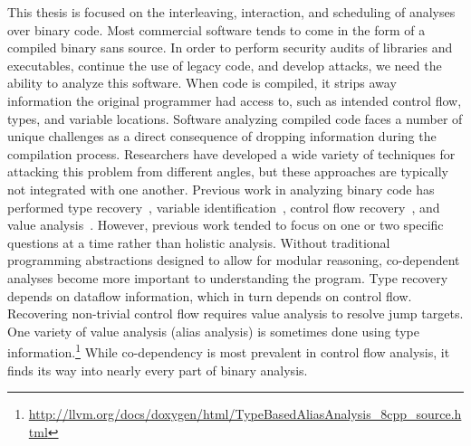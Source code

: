 {\fontsize{10}{12}\selectfont
This thesis is focused on the interleaving, interaction, and scheduling of analyses over binary code.
Most commercial software tends to come in the form of a compiled binary sans source.
In order to perform security audits of libraries and executables, continue the use of legacy code, and develop attacks, we need the ability to analyze this software.
When code is compiled, it strips away information the original programmer had access to, such as intended control flow, types, and variable locations.
Software analyzing compiled code faces a number of unique challenges as a direct consequence of dropping information during the compilation process.
Researchers have developed a wide variety of techniques for attacking this problem from different angles, but these approaches are typically not integrated with one another.
Previous work in analyzing binary code has performed type recovery~\cite{bitr}, variable identification~\cite{divine}, control flow recovery~\cite{jakstab,phoenix}, and value analysis~\cite{vsa}.
However, previous work tended to focus on one or two specific questions at a time rather than holistic analysis.
Without traditional programming abstractions designed to allow for modular reasoning, co-dependent analyses become more important to understanding the program.
Type recovery depends on dataflow information\cite{bitr,tie,sndwrite}, which in turn depends on control flow.
Recovering non-trivial control flow requires value analysis to resolve jump targets.
One variety of value analysis (alias analysis) is sometimes done using type information.\footnote {
  \url{http://llvm.org/docs/doxygen/html/TypeBasedAliasAnalysis_8cpp_source.html}
}
While co-dependency is most prevalent in control flow analysis, it finds its way into nearly every part of binary analysis.
}

